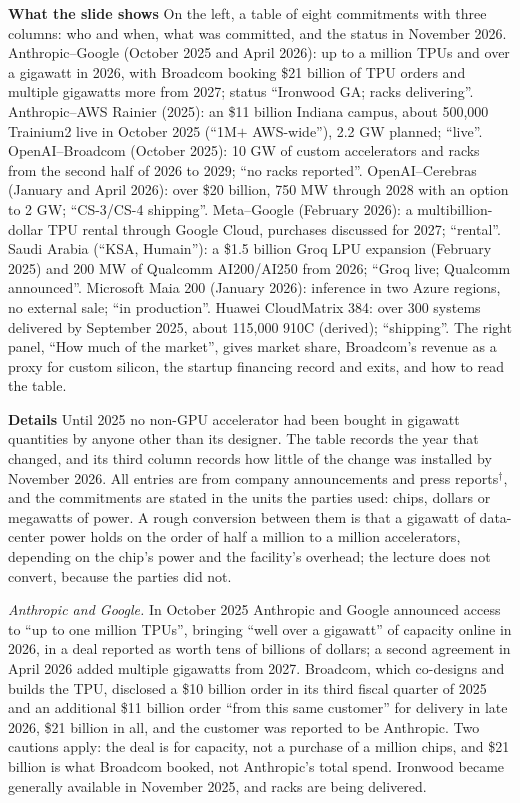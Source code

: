 \documentclass[11pt,letterpaper]{article}
\newcommand{\para}[1]{\medskip\noindent\textbf{#1}\quad}
\begin{document}
\para{What the slide shows} On the left, a table of eight commitments with three columns: who and when, what was committed, and the status in November 2026. Anthropic--Google (October 2025 and April 2026): up to a million TPUs and over a gigawatt in 2026, with Broadcom booking \$21 billion of TPU orders and multiple gigawatts more from 2027; status ``Ironwood GA; racks delivering''. Anthropic--AWS Rainier (2025): an \$11 billion Indiana campus, about 500{,}000 Trainium2 live in October 2025 (``1M$+$ AWS-wide''), 2.2 GW planned; ``live''. OpenAI--Broadcom (October 2025): 10 GW of custom accelerators and racks from the second half of 2026 to 2029; ``no racks reported''. OpenAI--Cerebras (January and April 2026): over \$20 billion, 750 MW through 2028 with an option to 2 GW; ``CS-3/CS-4 shipping''. Meta--Google (February 2026): a multibillion-dollar TPU rental through Google Cloud, purchases discussed for 2027; ``rental''. Saudi Arabia (``KSA, Humain''): a \$1.5 billion Groq LPU expansion (February 2025) and 200 MW of Qualcomm AI200/AI250 from 2026; ``Groq live; Qualcomm announced''. Microsoft Maia 200 (January 2026): inference in two Azure regions, no external sale; ``in production''. Huawei CloudMatrix 384: over 300 systems delivered by September 2025, about 115{,}000 910C (derived); ``shipping''. The right panel, ``How much of the market'', gives market share, Broadcom's revenue as a proxy for custom silicon, the startup financing record and exits, and how to read the table.

\para{Details} Until 2025 no non-GPU accelerator had been bought in gigawatt quantities by anyone other than its designer. The table records the year that changed, and its third column records how little of the change was installed by November 2026. All entries are from company announcements and press reports$^\dagger$, and the commitments are stated in the units the parties used: chips, dollars or megawatts of power. A rough conversion between them is that a gigawatt of data-center power holds on the order of half a million to a million accelerators, depending on the chip's power and the facility's overhead; the lecture does not convert, because the parties did not.

\emph{Anthropic and Google.} In October 2025 Anthropic and Google announced access to ``up to one million TPUs'', bringing ``well over a gigawatt'' of capacity online in 2026, in a deal reported as worth tens of billions of dollars; a second agreement in April 2026 added multiple gigawatts from 2027. Broadcom, which co-designs and builds the TPU, disclosed a \$10 billion order in its third fiscal quarter of 2025 and an additional \$11 billion order ``from this same customer'' for delivery in late 2026, \$21 billion in all, and the customer was reported to be Anthropic. Two cautions apply: the deal is for capacity, not a purchase of a million chips, and \$21 billion is what Broadcom booked, not Anthropic's total spend. Ironwood became generally available in November 2025, and racks are being delivered.
\end{document}
